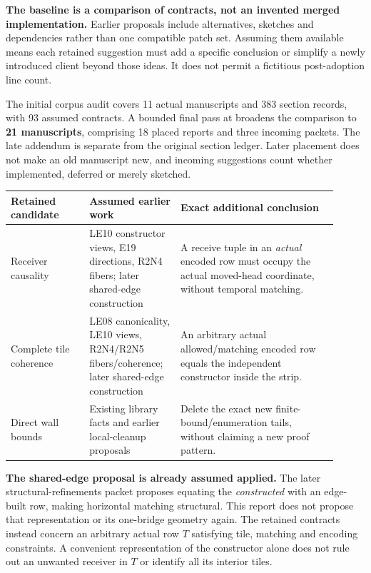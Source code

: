 \textbf{The baseline is a comparison of contracts, not an invented merged implementation.} Earlier proposals include alternatives, sketches and dependencies rather than one compatible patch set. Assuming them available means each retained suggestion must add a specific conclusion or simplify a newly introduced client beyond those ideas. It does not permit a fictitious post-adoption line count.

The initial corpus audit covers 11 actual manuscripts and 383 section records, with 93 assumed contracts. A bounded final pass at  broadens the comparison to \textbf{21 manuscripts}, comprising 18 placed reports and three incoming packets. The late addendum is separate from the original section ledger. Later placement does not make an old manuscript new, and incoming suggestions count whether implemented, deferred or merely sketched.

\begin{tabular}{@{}L{0.22\linewidth}L{0.25\linewidth}L{0.44\linewidth}@{}}\toprule
Retained candidate & Assumed earlier work & Exact additional conclusion\\\midrule
Receiver causality & LE10 constructor views, E19 directions, R2N4 fibers; later shared-edge construction & A receive tuple in an \emph{actual} encoded row must occupy the actual moved-head coordinate, without temporal matching.\\[6pt]
Complete tile coherence & LE08 canonicality, LE10 views, R2N4/R2N5 fibers/coherence; later shared-edge construction & An arbitrary actual allowed/matching encoded row equals the independent constructor inside the strip.\\[6pt]
Direct wall bounds & Existing library facts and earlier local-cleanup proposals & Delete the exact new finite-bound/enumeration tails, without claiming a new proof pattern.\\\bottomrule
\end{tabular}

\textbf{The shared-edge proposal is already assumed applied.} The later structural-refinements packet proposes equating the \emph{constructed}  with an edge-built row, making horizontal matching structural. This report does not propose that representation or its one-bridge geometry again. The retained contracts instead concern an arbitrary actual row $T$ satisfying tile, matching and encoding constraints. A convenient representation of the constructor alone does not rule out an unwanted receiver in $T$ or identify all its interior tiles.

